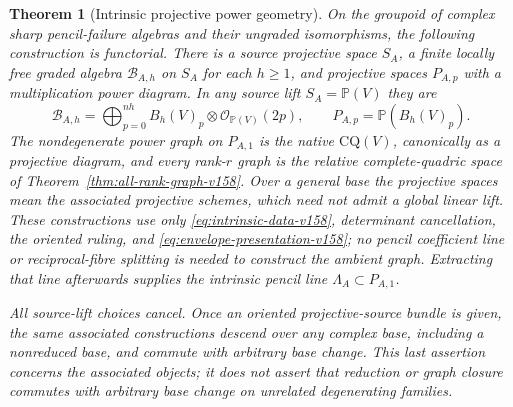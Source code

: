 \documentclass[11pt,reqno]{amsart}
\numberwithin{equation}{section}
\newtheorem{theorem}{Theorem}[section]
\theoremstyle{definition}\newtheorem{definition}[theorem]{Definition}
\theoremstyle{remark}\newtheorem{remark}[theorem]{Remark}
\newcommand{\Pj}{\mathbb P}\newcommand{\A}{\mathbb A}
\newcommand{\OO}{\mathcal O}\newcommand{\II}{\mathcal I}
\begin{document}
\begin{theorem}[Intrinsic projective power geometry]
\label{thm:intrinsic-envelope-v158}
On the groupoid of complex sharp pencil-failure algebras and their
ungraded isomorphisms, the following construction is functorial.
There is a source projective space $S_A$, a finite locally free graded
algebra $\mathscr B_{A,h}$ on $S_A$ for each $h\geq1$, and projective
spaces $P_{A,p}$ with a multiplication power diagram. In any source
lift $S_A=\Pj(V)$ they are
\begin{equation}\label{eq:normalized-envelope-v158}
 \mathscr B_{A,h}=
 \bigoplus_{p=0}^{nh}B_h(V)_p\otimes\OO_{\Pj(V)}(2p),\qquad
 P_{A,p}=\Pj(B_h(V)_p).
\end{equation}
The nondegenerate power graph on $P_{A,1}$ is the native
$\mathrm{CQ}(V)$, canonically as a projective diagram, and every
rank-$r$ graph is the relative complete-quadric space of
Theorem~\ref{thm:all-rank-graph-v158}. Over a general base the projective spaces mean the associated
projective schemes, which need not admit a global linear lift.
These constructions use only
\eqref{eq:intrinsic-data-v158}, determinant cancellation, the oriented
ruling, and \eqref{eq:envelope-presentation-v158}; no pencil coefficient
line or reciprocal-fibre splitting is needed to construct the ambient
graph. Extracting that line afterwards supplies the intrinsic pencil
line $\Lambda_A\subset P_{A,1}$.

All source-lift choices cancel. Once an oriented projective-source
bundle is given, the same associated constructions descend over any
complex base, including a nonreduced base, and commute with arbitrary
base change. This last assertion concerns the associated objects; it
does not assert that reduction or graph closure commutes with arbitrary
base change on unrelated degenerating families.
\end{theorem}
\end{document}
